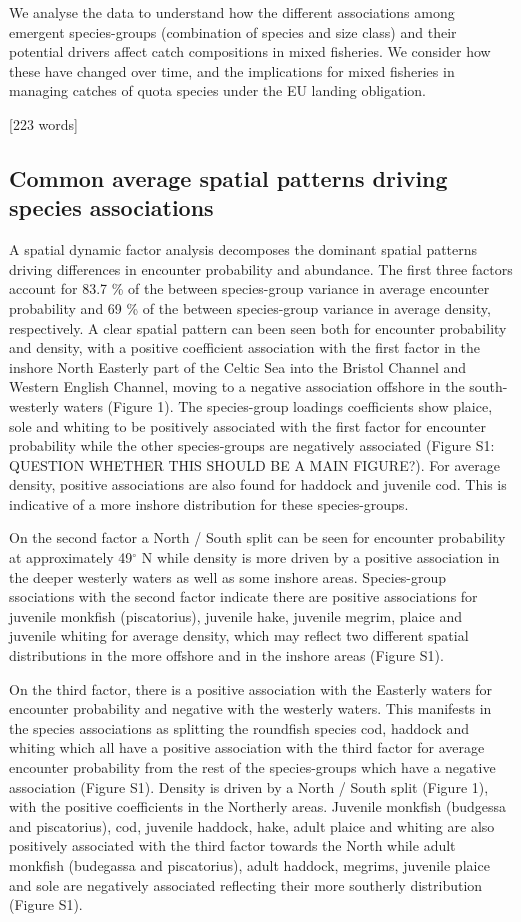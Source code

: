 \documentclass{nature}
\begin{document}
\begin{linenumbers}
We analyse the data to understand how the different associations among emergent
species-groups (combination of species and size class) and their potential
drivers affect catch compositions in mixed fisheries. We consider how these
have changed over time, and the implications for mixed fisheries in managing
catches of quota species under the EU landing obligation.

[223 words]

\subsection{Common average spatial patterns driving species associations} A
spatial dynamic factor analysis decomposes the dominant spatial patterns
driving differences in encounter probability and abundance. The first three
factors account for 83.7 \% of the between species-group variance in average
encounter probability and 69 \% of the between species-group variance in
average density, respectively. A clear spatial pattern can been seen both for
encounter probability and density, with a positive coefficient association with
the first factor in the inshore North Easterly part of the Celtic Sea into the
Bristol Channel and Western English Channel, moving to a negative association
offshore in the south-westerly waters (Figure 1). The species-group loadings
coefficients show plaice, sole and whiting to be positively associated with the
first factor for encounter probability while the other species-groups are
negatively associated (Figure S1: QUESTION WHETHER THIS SHOULD BE A MAIN
FIGURE?). For average density, positive associations are also found for haddock
and juvenile cod. This is indicative of a more inshore distribution for these
species-groups. 

On the second factor a North / South split can be seen for encounter
probability at approximately 49$^{\circ}$ N while density is more driven by a
positive association in the deeper westerly waters as well as some inshore
areas. Species-group ssociations with the second factor indicate there are
positive associations for juvenile monkfish (piscatorius), juvenile hake,
juvenile megrim, plaice and juvenile whiting for average density, which may
reflect two different spatial distributions in the more offshore and in the
inshore areas (Figure S1).

On the third factor, there is a positive association with the Easterly waters
for encounter probability and negative with the westerly waters. This manifests
in the species associations as splitting the roundfish species cod, haddock and
whiting which all have a positive association with the third factor for average
encounter probability from the rest of the species-groups which have a negative
association (Figure S1). Density is driven by a North / South split (Figure 1),
with the positive coefficients in the Northerly areas. Juvenile monkfish
(budgessa and piscatorius), cod, juvenile haddock, hake, adult plaice and
whiting are also positively associated with the third factor towards the North
while adult monkfish (budegassa and piscatorius), adult haddock, megrims,
juvenile plaice and sole are negatively associated reflecting their more
southerly distribution (Figure S1).


\end{linenumbers}
\end{document}
